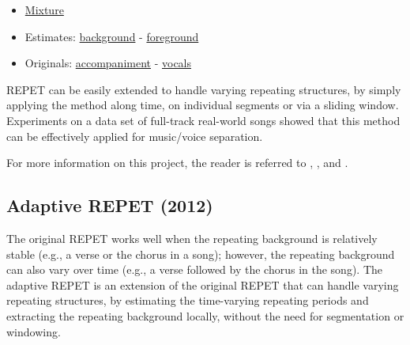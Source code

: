 \documentclass{article}
\begin{document}
\begin{itemize}[noitemsep,topsep=0pt]
\item \href{Audio/REPET/dev1__tamy-que_pena_tanto_faz__snip_6_19__mix.wav}{Mixture}
\item Estimates: \href{Audio/REPET/dev1__tamy-que_pena_tanto_faz__snip_6_19__mix_background.wav}{background} - \href{Audio/REPET/dev1__tamy-que_pena_tanto_faz__snip_6_19__mix_foreground.wav}{foreground}
\item Originals: \href{Audio/REPET/dev1__tamy-que_pena_tanto_faz__snip_6_19__guitar.wav}{accompaniment} - \href{Audio/REPET/dev1__tamy-que_pena_tanto_faz__snip_6_19__vocals.wav}{vocals}
\end{itemize}

REPET can be easily extended to handle varying repeating structures, by simply applying the method along time, on individual segments or via a sliding window. Experiments on a data set of full-track real-world songs showed that this method can be effectively applied for music/voice separation.

For more information on this project, the reader is referred to \cite{inproceedings_rafii_may2011}, \cite{article_rafii_jan2013}, and \cite{inbook_rafii_2014}.


\subsection{Adaptive REPET (2012)}
\label{ssec:repet_adaptive}

The original REPET works well when the repeating background is relatively stable (e.g., a verse or the chorus in a song); however, the repeating background can also vary over time (e.g., a verse followed by the chorus in the song). The adaptive REPET is an extension of the original REPET that can handle varying repeating structures, by estimating the time-varying repeating periods and extracting the repeating background locally, without the need for segmentation or windowing.
\end{document}

